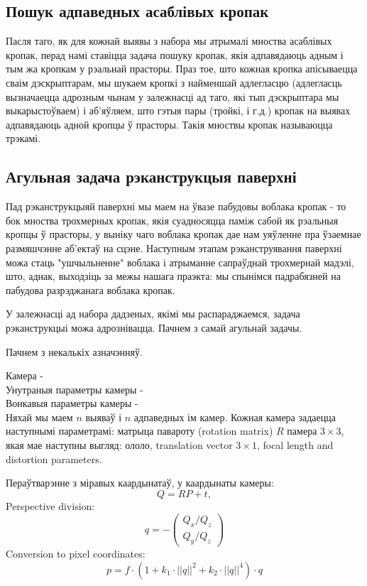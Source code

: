 \subsection*{Пошук адпаведных асаблівых кропак}
Пасля таго, як для кожнай выявы з набора мы атрымалі мноства асаблівых кропак, перад намі ставіцца задача пошуку кропак, якія адпавядаюць адным і тым жа кропкам у рэальнай прасторы. Праз тое, што кожная кропка апісываецца сваім дэскрыптарам, мы шукаем кропкі з найменшай адлегласцю (адлегласць вызначаецца адрозным чынам у залежнасці ад таго, які тып дэскрыптара мы выкарыстоўваем) і аб'яўляем, што гэтыя пары (тройкі, і г.д.) кропак на выявах адпавядаюць адной кропцы ў прасторы. Такія мноствы кропак называюцца трэкамі.

\subsection*{Агульная задача рэканструкцыя паверхні}
Пад рэканструкцыяй паверхні мы маем на ўвазе пабудовы воблака кропак - то бок мноства трохмерных кропак, якія суадносяцца паміж сабой як рэальныя кропцы ў прасторы, у выніку чаго воблака кропак дае нам уяўленне пра ўзаемнае размяшчэнне аб'ектаў на сцэне. Наступным этапам рэканструявання паверхні можа стаць "ушчыльненне" воблака і атрыманне сапраўднай трохмернай мадэлі, што, аднак, выходзіць за межы нашага праэкта: мы спынімся падрабязней на пабудова разрэджанага воблака кропак. \par
У залежнасці ад набора дадзеных, якімі мы распараджаемся, задача рэканструкцыі можа адрознівацца. Пачнем з самай агульнай задачы. \par
Пачнем з некалькіх азначэнняў. \par
Камера - \\
Унутраныя параметры камеры - \\
Вонкавыя параметры камеры - \\
Няхай мы маем $n$ выяваў і $n$ адпаведных ім камер. Кожная камера задаецца наступнымі параметрамі: матрыца павароту (rotation matrix) $R$ памера $3 \times 3$, якая мае наступны выгляд: ололо, translation vector $3 \times 1$, focal length and distortion parameters. \par
Пераўтварэнне з міравых каардынатаў, у каардынаты камеры:
$$ Q = RP + t, $$
Perspective division:
\[ q = - \left( \begin{array}{ccc}
Q_x / Q_z \\
Q_y / Q_z \end{array} \right) 
\]
Conversion to pixel coordinates:
$$ p = f \cdot (1 + k_1 \cdot ||q||^2 + k_2 \cdot ||q||^4) \cdot q $$

